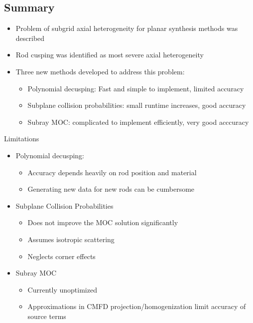 \subsection{Summary}
\begin{frame}
    
    \begin{itemize}
        \item Problem of subgrid axial heterogeneity for planar synthesis methods was described
        \item Rod cusping was identified as most severe axial heterogeneity
        \item Three new methods developed to address this problem:
        \begin{itemize}
            \item Polynomial decusping: Fast and simple to implement, limited accuracy
            \item Subplane collision probabilities: small runtime increases, good accuracy
            \item Subray MOC: complicated to implement efficiently, very good acccuracy
        \end{itemize}
    \end{itemize}
    
\end{frame}


\begin{frame}[t]{Limitations}

\begin{itemize}
    \item Polynomial decusping:
    \begin{itemize}
        \item Accuracy depends heavily on rod position and material
        \item Generating new data for new rods can be cumbersome
    \end{itemize}
    \item Subplane Collision Probabilities
    \begin{itemize}
        \item Does not improve the MOC solution significantly
        \item Assumes isotropic scattering
        \item Neglects corner effects
    \end{itemize}
    \item Subray MOC
    \begin{itemize}
        \item Currently unoptimized
        \item Approximations in CMFD projection/homogenization limit accuracy of source terms
    \end{itemize}
\end{itemize}
\end{frame}

